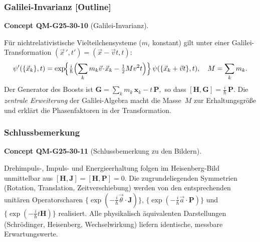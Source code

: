 \documentclass[10pt, letterpaper]{article}
\newcommand{\CustomHeading}[3]{%
  \par\medskip\noindent%
  \textbf{#1 #2} \textnormal{(#3)}.\enskip%
}
\newenvironment{CONC}[2]{\begin{unitbox}\CustomHeading{Concept}{#1}{#2}}{\end{unitbox}}
\begin{document}



\subsubsection*{Galilei-Invarianz [Outline]}


\begin{CONC}{QM-G25-30-10}{Galilei-Invarianz}
Für nichtrelativistische Vielteilchensysteme
($m_i$ konstant) gilt unter einer
Galilei-Transformation  $(\vec x\,',t')=(\vec x-\vec v t,t)$:
\[
  \psi'(\{\vec x_k\},t)
  =\exp\!\Bigl\{\tfrac{i}{\hbar}
                 \Bigl(\sum_k m_k\vec v\!\cdot\!\vec x_k
                       -\tfrac12 M v^{2}t\Bigr)\Bigr\}\,
    \psi(\{\vec x_k+\vec v t\},t),
  \quad
  M=\sum_k m_k .
\]
Der Generator des Boosts ist
\(
  \mathbf G
  =\sum_k m_k\,\mathbf x_k
  -t\,\mathbf P,
\)
so dass
$[\mathbf H,\mathbf G]=\tfrac{i}{\hbar}\,\mathbf P$.
Die \emph{zentrale Erweiterung} der Galilei-Algebra macht
die Masse~$M$ zur Erhaltungsgröße und erklärt die
Phasenfaktoren in der Transformation.
\end{CONC}


\subsubsection*{Schlussbemerkung}


\begin{CONC}{QM-G25-30-11}{Schlussbemerkung zu den Bildern}
Drehimpuls-, Impuls- und Energieerhaltung folgen im
Heisenberg-Bild unmittelbar aus
\(
  [\mathbf H,\mathbf J]=[\mathbf H,\mathbf P]=0.
\)
Die zugrundeliegenden Symmetrien (Rotation, Translation,
Zeitverschiebung) werden von den entsprechenden
unitären Operatorscharen
$\{\exp(-\tfrac{i}{\hbar}\vec\theta\!\cdot\!\mathbf J)\}$,
$\{\exp(-\tfrac{i}{\hbar}\vec a\!\cdot\!\mathbf P)\}$
und
$\{\exp(-\tfrac{i}{\hbar}t\mathbf H)\}$
realisiert.
Alle physikalisch äquivalenten Darstellungen
(Schrödinger, Heisenberg, Wechselwirkung)
liefern identische, messbare
Erwartungswerte.
\end{CONC}

\end{document}
